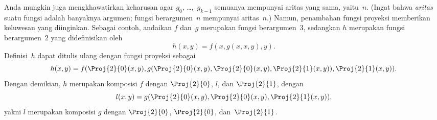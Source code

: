 \documentclass[../../../include/open-logic-section]{subfiles}
\begin{document}
Anda mungkin juga mengkhawatirkan keharusan agar $g_0$, \dots,~$g_{k-1}$
semuanya mempunyai aritas yang sama, yaitu~$n$. (Ingat bahwa \emph{aritas}
suatu fungsi adalah banyaknya argumen; fungsi berargumen~$n$ mempunyai
aritas~$n$.) Namun, penambahan fungsi proyeksi memberikan keluwesan yang
diinginkan. Sebagai contoh, andaikan $f$ dan~$g$ merupakan fungsi berargumen~$3$,
sedangkan $h$ merupakan fungsi berargumen~$2$ yang didefinisikan oleh
\[
h(x,y) = f(x,g(x,x,y),y).
\]
Definisi~$h$ dapat ditulis ulang dengan fungsi proyeksi sebagai
\[
h(x,y) = f(\Proj{2}{0}(x,y), g(\Proj{2}{0}(x,y), \Proj{2}{0}(x,y),
\Proj{2}{1}(x,y)), \Proj{2}{1}(x,y)).
\]
Dengan demikian, $h$ merupakan komposisi $f$ dengan $\Proj{2}{0}$, $l$, dan
$\Proj{2}{1}$, dengan
\[
l(x,y) = g(\Proj{2}{0}(x,y),\Proj{2}{0}(x,y),\Proj{2}{1}(x,y)),
\]
yakni $l$ merupakan komposisi $g$ dengan $\Proj{2}{0}$, $\Proj{2}{0}$,
dan~$\Proj{2}{1}$.
\end{document}
